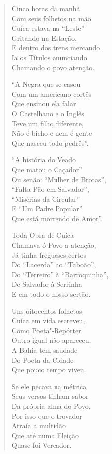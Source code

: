 \begin{verse}
Cinco horas da manhã \\
Com seus folhetos na mão \\
Cuíca estava na ``Leste'' \\
Gritando na Estação, \\
E dentro dos trens mercando \\
Ia os Títulos anunciando \\
Chamando o povo atenção. 

``A Negra que se casou \\
Com um americano cortês \\
Que ensinou ela falar \\
O Castelhano e o Inglês \\
Teve um filho diferente, \\
Não é bicho e nem é gente \\
Que nasceu todo pedrês''. 

``A história do Veado \\
Que matou o Caçador'' \\
Ou senão: ``Mulher de Brotas'', \\
``Falta Pão em Salvador'', \\
``Misérias da Circular'' \\
E ``Um Padre Popular'' \\
Que está morrendo de Amor''. 


Toda Obra de Cuíca \\
Chamava ó Povo a atenção, \\
Já tinha fregueses certos \\
Do ``Lacerda'' ao ``Taboão'', \\
Do ``Terreiro'' à ``Barroquinha'', \\
De Salvador à Serrinha \\
E em todo o nosso sertão. 

Uns oitocentos folhetos \\
Cuíca em vida escreveu, \\
Como Poeta"-Repórter \\
Outro igual não apareceu, \\
A Bahia tem saudade \\
Do Poeta da Cidade \\
Que pouco tempo viveu. 

Se ele pecava na métrica \\
Seus versos tinham sabor \\
Da própria alma do Povo, \\
Por isso que o trovador \\
Atraía a multidão \\
Que até numa Eleição \\
Quase foi Vereador. 


\end{verse}
